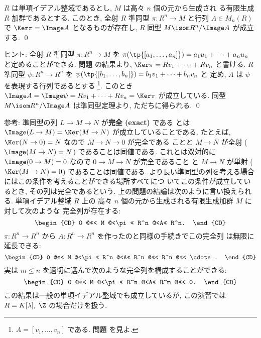 \documentclass[12pt,twoside]{jarticle}
\begin{document}

\begin{question}
\label{q:free-resol}
  $R$ は単項イデアル整域であるとし, $M$ は高々 $n$ 個の元から生成され
  る有限生成 $R$ 加群であるとする.
  このとき, 全射 $R$ 準同型 $\pi:R^n\to M$ と行列 $A\in M_n(R)$ 
  で $\Ker\pi=\Image A$ となるものが存在し, $R$ 同型 $M\isom R^n/\Image A$ 
  が成立する.
  \qed
\end{question}

\noindent
ヒント: 全射 $R$ 準同型 $\pi:R^n\to M$ 
を $\pi(\tp{[a_1,\dots,a_n]})=a_1u_1+\cdots+a_nu_n$ と定めることができる.  
問題  の結果より, $\Ker\pi = Rv_1+\cdots+Rv_n$ と書ける.
$R$ 準同型 $\psi:R^n\to R^n$ 
を $\psi(\tp{[b_1,\dots,b_n]})=b_1v_1+\cdots+b_nv_n$ と
定め, $A$ は $\psi$ を表現する行列であるとする%
\footnote{$A=[v_1,\dots,v_n]$ である. 問題  を見よ.}.
このとき $\Image A=\Image\psi=Rv_1+\cdots+Rv_n=\Ker\pi$ が成立している.
同型 $M\isom R^n/\Image A$ は準同型定理より, ただちに得られる.
\qed

\medskip
\noindent
参考: 準同型の列 $L\to M\to N$ が{\bf 完全 (exact)} である
とは $\Image(L\to M)=\Ker(M\to N)$ が成立していることである.
たとえば, $\Ker(N\to 0)=N$ なので $M\to N\to 0$ が完全である
ことと $M\to N$ が全射 ($\Image(M\to N)=N$) であることは同値である. 
これとは双対的に $\Image(0\to M)=0$ なので $0\to M\to N$ が完全であること
と $M\to N$ が単射 ($\Ker(M\to N)=0$) であることは同値である.
より長い準同型の列を考える場合にはこの条件を考えることができる場所すべてにつ
いてこの条件が成立しているとき, その列は完全であるという.
上の問題の結論は次のように言い換えられる. 単項イデアル整域 $R$ 上の
高々 $n$ 個の元から生成される有限生成加群 $M$ に対して次のような
完全列が存在する:
\begin{equation*}
  \begin{CD}
    0 @<<< M @<\pi<< R^n @<A<< R^n.
  \end{CD}
\end{equation*}
$\pi:R^n\to R^n$ から $A:R^n\to R^n$ を作ったのと同様の手続きでこの完全列
は無限に延長できる:
\begin{equation*}
  \begin{CD}
    0 @<<< M @<\pi<< R^n @<A<< R^n @<<< R^n @<<< \cdots.
  \end{CD}
\end{equation*}
実は $m\le n$ を適切に選んで次のような完全列を構成することができる:
\begin{equation*}
  \begin{CD}
    0 @<<< M @<\pi<< R^n @<A<< R^m @<<< 0.
  \end{CD}
\end{equation*}
この結果は一般の単項イデアル整域でも成立しているが, 
この演習では $R=K[\lambda],\;\Z$ の場合だけを扱う.
\end{document}
